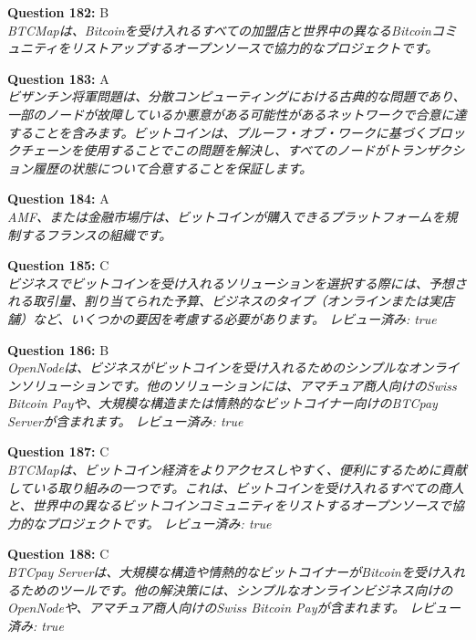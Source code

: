 \documentclass[12pt,a4paper]{article}
\begin{document}
\begin{enumerate}
{{{{{{{{{\item \textbf{Question 182:} B
\\ \textit{BTCMapは、Bitcoinを受け入れるすべての加盟店と世界中の異なるBitcoinコミュニティをリストアップするオープンソースで協力的なプロジェクトです。}

\item \textbf{Question 183:} A
\\ \textit{ビザンチン将軍問題は、分散コンピューティングにおける古典的な問題であり、一部のノードが故障しているか悪意がある可能性があるネットワークで合意に達することを含みます。ビットコインは、プルーフ・オブ・ワークに基づくブロックチェーンを使用することでこの問題を解決し、すべてのノードがトランザクション履歴の状態について合意することを保証します。}

\item \textbf{Question 184:} A
\\ \textit{AMF、または金融市場庁は、ビットコインが購入できるプラットフォームを規制するフランスの組織です。}

\item \textbf{Question 185:} C
\\ \textit{ビジネスでビットコインを受け入れるソリューションを選択する際には、予想される取引量、割り当てられた予算、ビジネスのタイプ（オンラインまたは実店舗）など、いくつかの要因を考慮する必要があります。 レビュー済み: true}

\item \textbf{Question 186:} B
\\ \textit{OpenNodeは、ビジネスがビットコインを受け入れるためのシンプルなオンラインソリューションです。他のソリューションには、アマチュア商人向けのSwiss Bitcoin Payや、大規模な構造または情熱的なビットコイナー向けのBTCpay Serverが含まれます。 レビュー済み: true}

\item \textbf{Question 187:} C
\\ \textit{BTCMapは、ビットコイン経済をよりアクセスしやすく、便利にするために貢献している取り組みの一つです。これは、ビットコインを受け入れるすべての商人と、世界中の異なるビットコインコミュニティをリストするオープンソースで協力的なプロジェクトです。 レビュー済み: true}

\item \textbf{Question 188:} C
\\ \textit{BTCpay Serverは、大規模な構造や情熱的なビットコイナーがBitcoinを受け入れるためのツールです。他の解決策には、シンプルなオンラインビジネス向けのOpenNodeや、アマチュア商人向けのSwiss Bitcoin Payが含まれます。
レビュー済み: true}

}}}}}}}}}
\end{enumerate}
\end{document}
